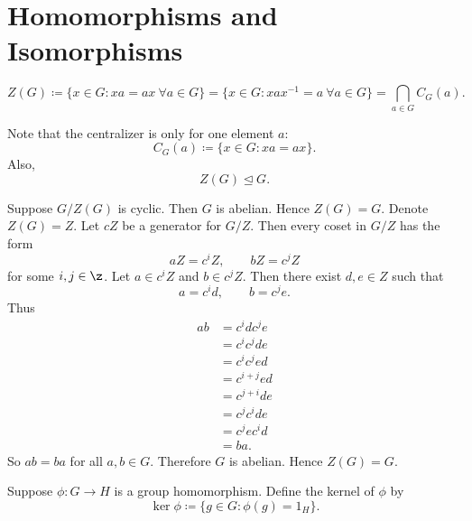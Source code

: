 
\section{Homomorphisms and Isomorphisms}

\begin{definition}[Center]
    \[
        Z(G)\coloneqq \{x\in G: xa=ax\ \forall a\in G\}
        =
        \{x\in G: xax^{-1}=a\ \forall a\in G\}
        =
        \bigcap\limits_{a\in G} C_G(a).
    \]
\end{definition}

Note that the centralizer is only for one element $a$:
\[
    C_G(a)\coloneqq \{x\in G: xa=ax\}.
\]
Also,
\[
    Z(G)\trianglelefteq G.
\]
\begin{theorem}{
    Suppose $G/Z(G)$ is cyclic.
    Then $G$ is abelian.
    Hence $Z(G)=G$.
}
Denote $Z(G)=Z$.
Let $cZ$ be a generator for $G/Z$.
Then every coset in $G/Z$ has the form
\[
    aZ=c^{i}Z,
    \qquad
    bZ=c^{j}Z
\]
for some $i,j\in \z$.
Let $a\in c^{i}Z$ and $b\in c^{j}Z$.
Then there exist $d,e\in Z$ such that
\[
    a=c^{i}d,
    \qquad
    b=c^{j}e.
\]
Thus
\begin{align*}
    ab &= c^{i}dc^{j}e\\
    &= c^{i}c^{j}de\\
    &= c^{i}c^{j}ed\\
    &= c^{i+j}ed\\
    &= c^{j+i}de\\
    &= c^{j}c^{i}de\\
    &= c^{j}ec^{i}d\\
    &= ba.
\end{align*}
So $ab=ba$ for all $a,b\in G$.
Therefore $G$ is abelian.
Hence $Z(G)=G$.
\end{theorem}

\begin{definition}
    Suppose $\phi:G\to H$ is a group homomorphism.
    Define the kernel of $\phi$ by
    \[
        \ker\phi \coloneqq \{g\in G:\phi(g)=1_H\}.
    \]
\end{definition}

